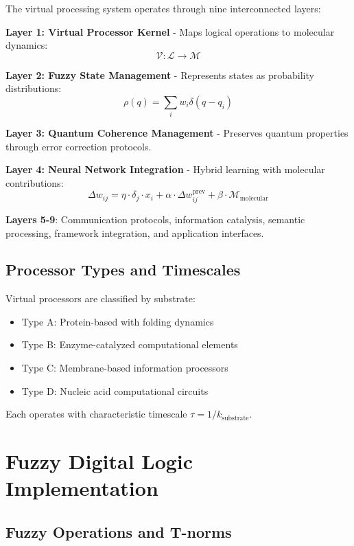 \documentclass[12pt]{article}
\begin{document}
The virtual processing system operates through nine interconnected layers:

\textbf{Layer 1: Virtual Processor Kernel} - Maps logical operations to molecular dynamics:
\begin{equation}
\mathcal{V}: \mathcal{L} \rightarrow \mathcal{M}
\end{equation}

\textbf{Layer 2: Fuzzy State Management} - Represents states as probability distributions:
\begin{equation}
\rho(q) = \sum_i w_i \delta(q - q_i)
\end{equation}

\textbf{Layer 3: Quantum Coherence Management} - Preserves quantum properties through error correction protocols.

\textbf{Layer 4: Neural Network Integration} - Hybrid learning with molecular contributions:
\begin{equation}
\Delta w_{ij} = \eta \cdot \delta_j \cdot x_i + \alpha \cdot \Delta w_{ij}^{\text{prev}} + \beta \cdot \mathcal{M}_{\text{molecular}}
\end{equation}

\textbf{Layers 5-9}: Communication protocols, information catalysis, semantic processing, framework integration, and application interfaces.

\subsection{Processor Types and Timescales}

Virtual processors are classified by substrate:
\begin{itemize}
\item Type A: Protein-based with folding dynamics
\item Type B: Enzyme-catalyzed computational elements
\item Type C: Membrane-based information processors
\item Type D: Nucleic acid computational circuits
\end{itemize}

Each operates with characteristic timescale $\tau = 1/k_{\text{substrate}}$.

\section{Fuzzy Digital Logic Implementation}

\subsection{Fuzzy Operations and T-norms}
\end{document}
